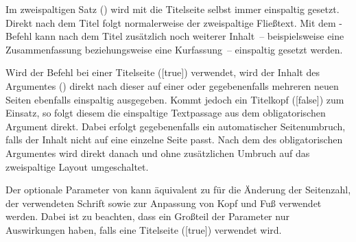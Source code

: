 \begin{Declaration}{%
}
\printdeclarationlist%
%
%
%
%
Im zweispaltigen Satz () wird mit  die 
Titelseite selbst immer einspaltig gesetzt. Direkt nach dem Titel folgt 
normalerweise der zweispaltige Fließtext. Mit dem \TUDScript-Befehl 
 kann nach dem Titel zusätzlich noch weiterer 
Inhalt~-- beispielsweise eine Zusammenfassung beziehungsweise eine 
Kurfassung~-- einspaltig gesetzt werden.

Wird der Befehl bei einer Titelseite ([true]) verwendet, wird 
der Inhalt des Argumentes () direkt nach dieser auf einer 
oder gegebenenfalls mehreren neuen Seiten ebenfalls einspaltig ausgegeben. 
Kommt jedoch ein Titelkopf ([false]) zum Einsatz, so folgt 
diesem die einspaltige Textpassage aus dem obligatorischen Argument direkt. 
Dabei erfolgt gegebenenfalls ein automatischer Seitenumbruch, falls der Inhalt 
nicht auf eine einzelne Seite passt. Nach dem  des 
obligatorischen Argumentes wird direkt danach und ohne zusätzlichen Umbruch auf 
das zweispaltige Layout umgeschaltet.

Der optionale Parameter von  kann äquivalent zu 
 für die Änderung der Seitenzahl, der verwendeten Schrift 
sowie zur Anpassung von Kopf und Fuß verwendet werden. Dabei ist zu beachten, 
dass ein Großteil der Parameter nur Auswirkungen haben, falls eine Titelseite
([true]) verwendet wird.
\end{Declaration}


